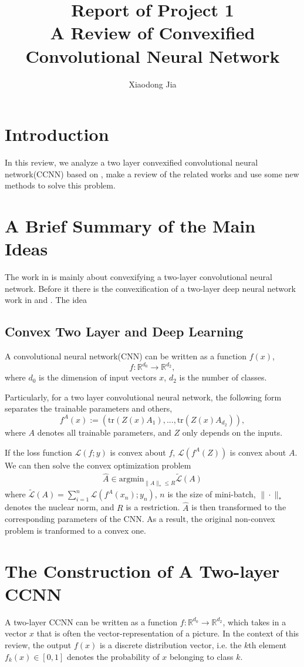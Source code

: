 \documentclass{article}
\title{Report of Project 1\\A Review of Convexified Convolutional Neural Network}
\author{Xiaodong Jia}
\begin{document}
\maketitle

\tableofcontents
\newpage

\section{Introduction}
In this review, we analyze a two layer convexified convolutional neural network(CCNN) based on \cite{zhang2016convexified}, make a review of the related works and use some new methods to solve this problem.
\section{A Brief Summary of the Main Ideas}
The work in \cite{zhang2016convexified} is mainly about convexifying a two-layer convolutional neural network. Before it there is the convexification of a two-layer deep neural network work in \cite{aslan2013convex} and \cite{aslan2014convex}. The idea 
\subsection{Convex Two Layer and Deep Learning}
A convolutional neural network(CNN) can be written as a function $f(x)$,
\[f:\mathbb{R}^{d_0}\rightarrow\mathbb{R}^{d_2},\] where $d_0$ is the dimension of input vectors $x$, $d_2$ is the number of classes.

Particularly, for a two layer convolutional neural network, the following form separates the trainable parameters and others,
\[f^A(x):=(\text{tr}(Z(x)A_1),...,\text{tr}(Z(x)A_{d_2})),\]
where $A$ denotes all trainable parameters, and $Z$ only depends on the inputs.

If the loss function $\mathcal{L}(f;y)$ is convex about $f$, $\mathcal{L}(f^A(Z))$ is convex about $A$. We can then solve the convex optimization problem
\begin{align*}
\widehat{A}\in\text{argmin}_{\|A\|_*\leq R}\tilde{\mathcal{L}}(A)
\end{align*}
where $\tilde{\mathcal{L}}(A)=\sum_{i=1}^n\mathcal{L}(f^A(x_n);y_n)$, $n$ is the size of mini-batch, $\|\cdot\|_*$ denotes the nuclear norm, and $R$ is a restriction. $\widehat{A}$ is then transformed to the corresponding parameters of the CNN. As a result, the original non-convex problem is tranformed to a convex one. 
\section{The Construction of A Two-layer CCNN}
A two-layer CCNN can be written as a function $f:\mathbb{R}^{d_0}\rightarrow\mathbb{R}^{d_2}$, which takes in a vector $x$ that is often the vector-representation of a picture. In the context of this review, the output $f(x)$ is a discrete distribution vector, i.e. the $k$th element $f_k(x)\in\left[0,1\right] $ denotes the probability of $x$ belonging to class $k$.
\end{document}
